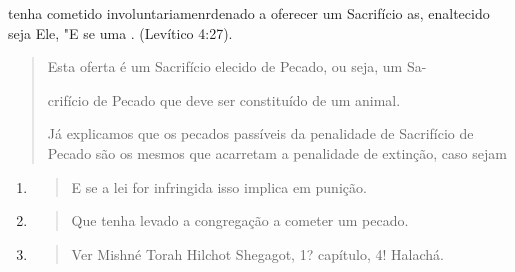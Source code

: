 tenha cometido involuntariamen­rdenado a oferecer um Sacrifício as,
enaltecido seja Ele, "E se uma . (Levítico 4:27).

\begin{quote}
Esta oferta é um Sacrifício elecido de Pecado, ou seja, um Sa-

crifício de Pecado que deve ser constituído de um animal.

Já explicamos que os pecados passíveis da penalidade de Sacrifício de
Pecado são os mesmos que acarretam a penalidade de extinção, caso sejam
\end{quote}

\begin{enumerate}
\def\labelenumi{\arabic{enumi}.}
\setcounter{enumi}{84}
\item
 \begin{quote}
 E se a lei for infringida isso implica em punição.
 \end{quote}
\item
 \begin{quote}
 Que tenha levado a congregação a cometer um pecado.
 \end{quote}
\item
 \begin{quote}
 Ver Mishné Torah Hilchot Shegagot, 1? capítulo, 4! Halachá.
 \end{quote}
\end{enumerate}

